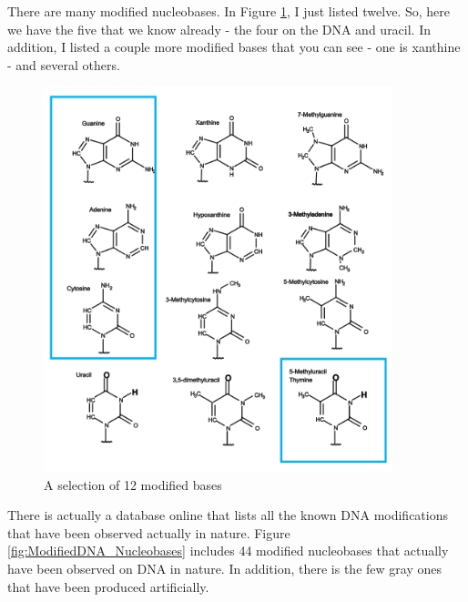 \documentclass[]{article}
\begin{document}
There are many modified nucleobases.
In Figure \ref{fig:ModifiedBases}, I just listed twelve.
So, here we have the five
that we know already -
the four on the DNA and uracil.
In addition, I listed a couple more
modified bases that you can see -
one is xanthine - and several others.

\begin{figure}[H]
	\caption{A selection of 12 modified bases}\label{fig:ModifiedBases} 
	\includegraphics[width=0.9\textwidth]{ModifiedBases}
\end{figure}


There is actually a database online
that lists
all the known DNA modifications
that have been observed
actually in nature.
Figure \ref{fig:ModifiedDNA_Nucleobases} includes 44 modified nucleobases
that actually have been observed
on DNA in nature.
In addition, there is the few gray ones
that have been produced artificially.
\end{document}
